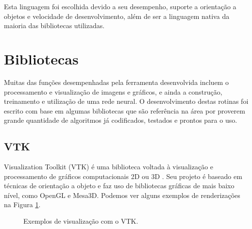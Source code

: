 Esta linguagem foi escolhida devido a seu desempenho, suporte a orientação a objetos e velocidade de desenvolvimento, além de ser a linguagem nativa da maioria das bibliotecas utilizadas.

\section{Bibliotecas}

Muitas das funções desempenhadas pela ferramenta desenvolvida incluem o processamento e visualização de imagens e gráficos, e ainda a construção, treinamento e utilização de uma rede neural. O desenvolvimento destas rotinas foi escrito com base em algumas bibliotecas que são referência na área por proverem grande quantidade de algoritmos já codificados, testados e prontos para o uso.


\subsection{VTK}

Visualization Toolkit (VTK) é uma biblioteca voltada à visualização e processamento de gráficos computacionais 2D ou 3D \cite{vtk}. Seu projeto é baseado em técnicas de orientação a objeto e faz uso de bibliotecas gráficas de mais baixo nível, como OpenGL e Mesa3D. Podemos ver alguns exemplos de renderizações na Figura \ref{fig:vtk-ex}.

\begin{figure}[ht]
 \begin{center}
 \end{center}
 \caption{Exemplos de visualização com o VTK.}
 \label{fig:vtk-ex}
\end{figure}

